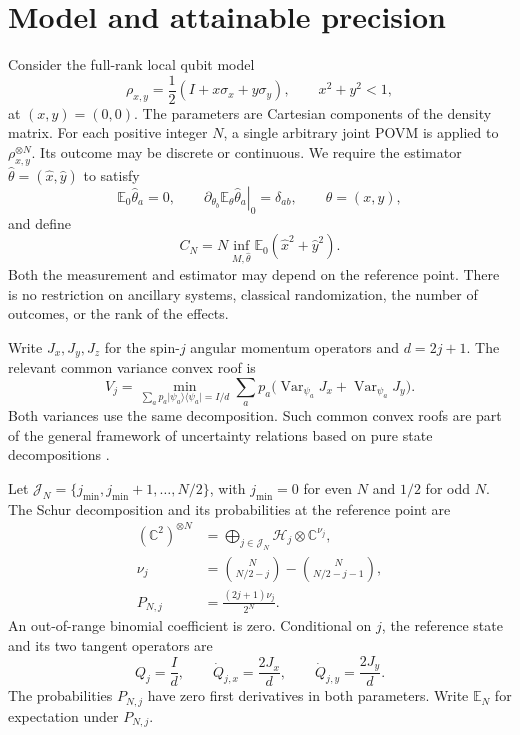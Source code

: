 \documentclass[aps,pra,reprint,superscriptaddress]{revtex4-2}
\theoremstyle{remark}
\DeclareMathOperator{\Var}{Var}
\newcommand{\E}{\mathbb E}
\newcommand{\C}{\mathbb C}
\newcommand{\ket}[1]{\lvert#1\rangle}
\newcommand{\bra}[1]{\langle#1\rvert}
\begin{document}
\section{Model and attainable precision}\label{sec:model}\label{sec:reduction}
Consider the full-rank local qubit model
\begin{equation}
 \rho_{x,y}=\frac12(I+x\sigma_x+y\sigma_y),\qquad x^2+y^2<1,
 \label{eq:model}
\end{equation}
at $(x,y)=(0,0)$. The parameters are Cartesian components of the
density matrix. For each positive integer $N$, a single arbitrary joint
POVM is applied to $\rho_{x,y}^{\otimes N}$. Its outcome may be discrete
or continuous. We require the estimator $\widehat\theta=(\widehat x,
\widehat y)$ to satisfy
\begin{equation}
 \E_0\widehat\theta_a=0,\qquad
 \left.\partial_{\theta_b}\E_\theta\widehat\theta_a\right|_0
 =\delta_{ab},\qquad \theta=(x,y),
 \label{eq:unbiased}
\end{equation}
and define
\begin{equation}
 C_N=N\inf_{M,\widehat\theta}
 \E_0(\widehat x^2+\widehat y^2).
 \label{eq:risk}
\end{equation}
Both the measurement and estimator may depend on the reference point.
There is no restriction on ancillary systems, classical randomization,
the number of outcomes, or the rank of the effects.

Write $J_x,J_y,J_z$ for the spin-$j$ angular momentum operators and
$d=2j+1$. The relevant common variance convex roof is
\begin{equation}
 V_j=\min_{\sum_a p_a\ket{\psi_a}\bra{\psi_a}=I/d}
 \sum_a p_a\bigl(\Var_{\psi_a}J_x+\Var_{\psi_a}J_y\bigr).
 \label{eq:roof}
\end{equation}
Both variances use the same decomposition. Such common convex roofs are
part of the general framework of uncertainty relations based on pure
state decompositions \cite{TothFrowis2022}.

Let $\mathcal J_N=\{j_{\min},j_{\min}+1,\ldots,N/2\}$, with
$j_{\min}=0$ for even $N$ and $1/2$ for odd $N$. The Schur decomposition
and its probabilities at the reference point are
\begin{equation}
\begin{aligned}
(\C^2)^{\otimes N}
 &=\bigoplus_{j\in\mathcal J_N}\mathcal H_j\otimes\C^{\nu_j},\\
\nu_j&=\binom N{N/2-j}-\binom N{N/2-j-1},\\
P_{N,j}&=\frac{(2j+1)\nu_j}{2^N}.
\end{aligned}
\label{eq:schur}
\end{equation}
An out-of-range binomial coefficient is zero. Conditional on $j$, the
reference state and its two tangent operators are
\begin{equation}
 Q_j=\frac{I}{d},\qquad \dot Q_{j,x}=\frac{2J_x}{d},\qquad
 \dot Q_{j,y}=\frac{2J_y}{d}.
 \label{eq:tangents}
\end{equation}
The probabilities $P_{N,j}$ have zero first derivatives in both
parameters. Write $\E_N$ for expectation under $P_{N,j}$.
\end{document}
